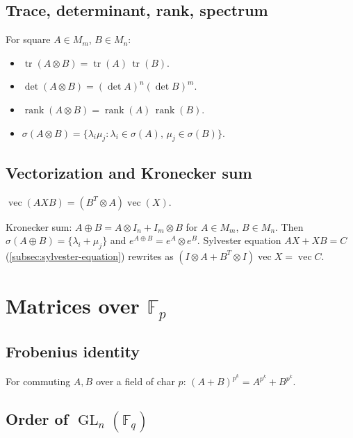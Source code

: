 \medskip

\subsection{Trace, determinant, rank, spectrum}
\label{subsec:kronecker-invariants}

For square $A\in M_m$, $B\in M_n$:
\begin{itemize}
\item $\operatorname{tr}(A\otimes B) = \operatorname{tr}(A)\,\operatorname{tr}(B)$.
\item $\det(A\otimes B) = (\det A)^n (\det B)^m$.
\item $\operatorname{rank}(A\otimes B) = \operatorname{rank}(A)\,\operatorname{rank}(B)$.
\item $\sigma(A\otimes B) = \{\lambda_i\mu_j : \lambda_i\in\sigma(A),\,\mu_j\in\sigma(B)\}$.
\end{itemize}

\medskip

\subsection{Vectorization and Kronecker sum}
\label{subsec:kronecker-vec}

$\operatorname{vec}(AXB) = (B^T\otimes A)\operatorname{vec}(X)$.

Kronecker sum: $A\oplus B = A\otimes I_n + I_m\otimes B$ for $A\in M_m$, $B\in M_n$.
Then $\sigma(A\oplus B)=\{\lambda_i+\mu_j\}$ and $e^{A\oplus B}=e^A\otimes e^B$.
Sylvester equation $AX+XB=C$ (\ref{subsec:sylvester-equation}) rewrites as
$(I\otimes A + B^T\otimes I)\operatorname{vec}X = \operatorname{vec}C$.

\medskip

\section{Matrices over $\mathbb{F}_p$}
\label{sec:matrices-over-fp}

\subsection{Frobenius identity}
\label{subsec:frobenius-identity}

For commuting $A,B$ over a field of char $p$: $(A+B)^{p^k}=A^{p^k}+B^{p^k}$.

\subsection{Order of $\operatorname{GL}_n(\mathbb{F}_q)$}
\label{subsec:order-gl}


